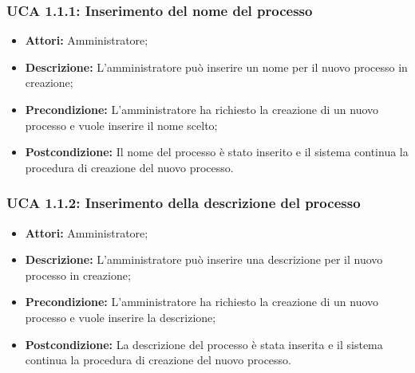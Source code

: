\hypertarget{A1.1.1}{}
\subsubsection{UCA 1.1.1: Inserimento del nome del processo}
\begin{itemize}
\item \textbf{Attori:}
Amministratore;
\item \textbf{Descrizione:}
L'amministratore può inserire un nome per il nuovo processo in creazione;
\item \textbf{Precondizione:}
L'amministratore ha richiesto la creazione di un nuovo processo e vuole inserire il nome scelto;
\item \textbf{Postcondizione:}
Il nome del processo è stato inserito e il sistema continua la procedura di creazione del nuovo processo.
\end{itemize}

\hypertarget{A1.1.2}{}
\subsubsection{UCA 1.1.2: Inserimento della descrizione del processo}

\begin{itemize}
\item \textbf{Attori:}
Amministratore;
\item \textbf{Descrizione:}
L'amministratore può inserire una descrizione per il nuovo processo in creazione;
\item \textbf{Precondizione:}
L'amministratore ha richiesto la creazione di un nuovo processo e vuole inserire la descrizione;
\item \textbf{Postcondizione:}
La descrizione del processo è stata inserita e il sistema continua la procedura di creazione del nuovo processo.
\end{itemize}

\hypertarget{A1.2}{}

